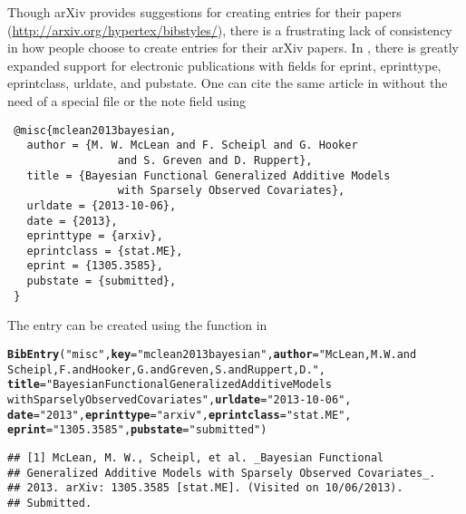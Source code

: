 \documentclass[article]{jss}\usepackage[]{graphicx}\usepackage[]{color}
\makeatletter
\newcommand{\hlstr}[1]{\textcolor[rgb]{0.125,0.125,1}{#1}}%
\newcommand{\hlstd}[1]{\textcolor[rgb]{0.251,0.251,0.282}{#1}}%
\newcommand{\hlkwc}[1]{\textcolor[rgb]{0.529,0,0.184}{\textbf{#1}}}%
\newcommand{\hlkwd}[1]{\textcolor[rgb]{0.251,0.251,0.282}{\textbf{#1}}}%
\newenvironment{kframe}{%
 \def\at@end@of@kframe{}%
 \ifinner\ifhmode%
  \def\at@end@of@kframe{\end{minipage}}%
  \begin{minipage}{\columnwidth}%
 \fi\fi%
 \def\FrameCommand##1{\hskip\@totalleftmargin \hskip-\fboxsep
 \colorbox{shadecolor}{##1}\hskip-\fboxsep
     \hskip-\linewidth \hskip-\@totalleftmargin \hskip\columnwidth}%
 \MakeFramed {\advance\hsize-\width
   \@totalleftmargin\z@ \linewidth\hsize
   \@setminipage}}%
 {\par\unskip\endMakeFramed%
 \at@end@of@kframe}
\newenvironment{knitrout}{}{} %
\newcommand{\ourpkg}{\pkg{RefManageR}}
\makeatother
\begin{document}
Though arXiv provides suggestions for creating \Bibtex{} entries for their papers (\url{http://arxiv.org/hypertex/bibstyles/}), there is a frustrating lack of consistency in how people choose to create \Bibtex{} entries for their arXiv papers.  In \Biblatex{}, there is greatly expanded support for electronic publications with fields for eprint, eprinttype, eprintclass, urldate, and pubstate.  One can cite the same article in \Biblatex{} without the need of a special  file or the note field using
 \begin{verbatim}
 @misc{mclean2013bayesian,
   author = {M. W. McLean and F. Scheipl and G. Hooker
                 and S. Greven and D. Ruppert},
   title = {Bayesian Functional Generalized Additive Models 
                 with Sparsely Observed Covariates},
   urldate = {2013-10-06},
   date = {2013},
   eprinttype = {arxiv},
   eprintclass = {stat.ME},
   eprint = {1305.3585},
   pubstate = {submitted},
 }
 \end{verbatim}
 The entry can be created using the  function in \ourpkg{}
\begin{knitrout}
\color{fgcolor}\begin{kframe}
\begin{alltt}
\hlkwd{BibEntry}\hlstd{(}\hlstr{"misc"}\hlstd{,} \hlkwc{key} \hlstd{=} \hlstr{"mclean2013bayesian"}\hlstd{,} \hlkwc{author} \hlstd{=} \hlstr{"McLean, M. W. and 
         Scheipl, F. and Hooker, G. and Greven, S. and Ruppert, D."}\hlstd{,}
         \hlkwc{title} \hlstd{=} \hlstr{"Bayesian Functional Generalized Additive Models 
                 with Sparsely Observed Covariates"}\hlstd{,} \hlkwc{urldate} \hlstd{=} \hlstr{"2013-10-06"}\hlstd{,}
         \hlkwc{date} \hlstd{=} \hlstr{"2013"}\hlstd{,} \hlkwc{eprinttype} \hlstd{=} \hlstr{"arxiv"}\hlstd{,} \hlkwc{eprintclass} \hlstd{=} \hlstr{"stat.ME"}\hlstd{,}
         \hlkwc{eprint} \hlstd{=} \hlstr{"1305.3585"}\hlstd{,} \hlkwc{pubstate} \hlstd{=} \hlstr{"submitted"}\hlstd{)}
\end{alltt}
\begin{verbatim}
## [1] McLean, M. W., Scheipl, et al. _Bayesian Functional
## Generalized Additive Models with Sparsely Observed Covariates_.
## 2013. arXiv: 1305.3585 [stat.ME]. (Visited on 10/06/2013).
## Submitted.
\end{verbatim}
\end{kframe}
\end{knitrout}
\end{document}
